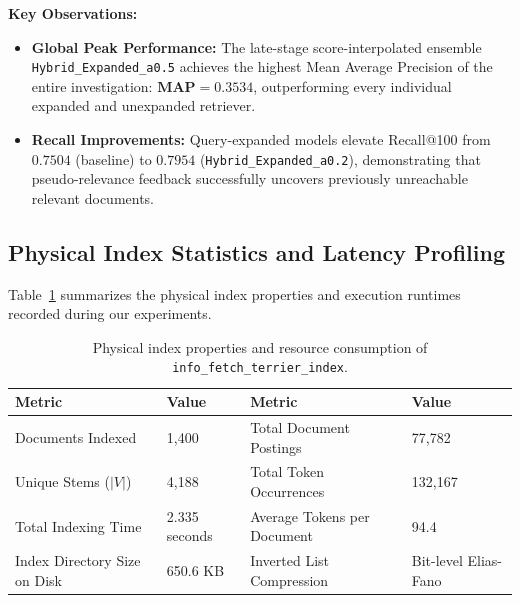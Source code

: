 \documentclass[10pt, a4paper]{article}
\begin{document}
\noindent \textbf{Key Observations:}
\begin{itemize}[noitemsep,topsep=2pt]
    \item \textbf{Global Peak Performance:} The late-stage score-interpolated ensemble \texttt{Hybrid\_Expanded\_a0.5} achieves the highest Mean Average Precision of the entire investigation: $\mathbf{MAP = 0.3534}$, outperforming every individual expanded and unexpanded retriever.
    \item \textbf{Recall Improvements:} Query-expanded models elevate Recall@100 from $0.7504$ (baseline) to $\mathbf{0.7954}$ (\texttt{Hybrid\_Expanded\_a0.2}), demonstrating that pseudo-relevance feedback successfully uncovers previously unreachable relevant documents.
\end{itemize}

\subsection{Physical Index Statistics and Latency Profiling}
\label{sec:results_latency}

Table~\ref{tab:index_stats} summarizes the physical index properties and execution runtimes recorded during our experiments.

\begin{table}[H]
\centering
\small
\begin{tabular}{@{}ll|ll@{}}
\toprule
\textbf{Metric} & \textbf{Value} & \textbf{Metric} & \textbf{Value} \\ \midrule
Documents Indexed & 1,400 & Total Document Postings & 77,782 \\
Unique Stems ($|V|$) & 4,188 & Total Token Occurrences & 132,167 \\
Total Indexing Time & 2.335 seconds & Average Tokens per Document & 94.4 \\
Index Directory Size on Disk & 650.6 KB & Inverted List Compression & Bit-level Elias-Fano \\ \bottomrule
\end{tabular}
\caption{Physical index properties and resource consumption of \texttt{info\_fetch\_terrier\_index}.}
\label{tab:index_stats}
\end{table}
\end{document}

